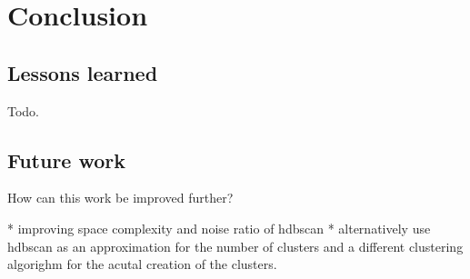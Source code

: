 \section{Conclusion}

\subsection{Lessons learned}
Todo.

\subsection{Future work}

How can this work be improved further?

* improving space complexity and noise ratio of hdbscan
* alternatively use hdbscan as an approximation for the number of clusters and a different clustering algorighm for the acutal creation of the clusters.
